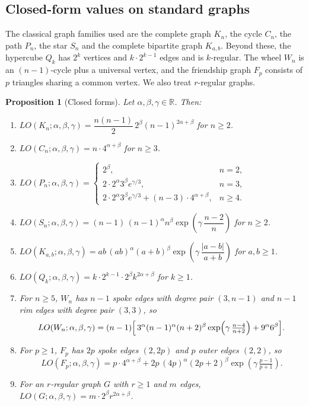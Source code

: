 \documentclass[a5paper, 10pt]{article}
\theoremstyle{plain}
\newtheorem{proposition}[theorem]{Proposition}
\theoremstyle{remark}
\theoremstyle{definition}
\newcommand{\Wuzi}{LO(G;\alpha,\beta,\gamma)}
\begin{document}
\subsection*{Closed-form values on standard graphs}\label{sec:closedforms}
The classical graph families used are the complete graph $K_n$, the
cycle $C_n$, the path $P_n$, the star $S_n$ and the complete bipartite
graph $K_{a,b}$. Beyond these, the hypercube $Q_k$ has $2^k$ vertices and
$k \cdot 2^{k - 1}$ edges and is $k$-regular. The wheel $W_n$ is an
$(n - 1)$-cycle plus a universal vertex, and the friendship graph $F_p$
consists of $p$ triangles sharing a common vertex. We also treat $r$-regular graphs.

  \begin{proposition}[Closed forms]\label{prop:closedforms}
  Let $\alpha, \beta, \gamma \in \mathbb{R}$. Then:
  \begin{enumerate}
  \item  $LO(K_n; \alpha, \beta, \gamma) =
    \dfrac{n(n-1)}{2}\,2^{\beta}(n - 1)^{2\alpha + \beta}$ for $n \ge 2$.
  \item  $LO(C_n; \alpha, \beta, \gamma) = n \cdot 4^{\alpha +
  \beta}$
    for $n \ge 3$.
  \item
    $LO(P_n; \alpha, \beta, \gamma) =
    \begin{cases}
      2^{\beta}, & n = 2,\\[2pt]
      2 \cdot 2^{\alpha} 3^{\beta} e^{\gamma/3}, & n = 3,\\[2pt]
      2 \cdot 2^{\alpha} 3^{\beta} e^{\gamma/3} + (n - 3) \cdot 4^{\alpha +
  \beta},
         & n \ge 4.
    \end{cases}$
  \item  $LO(S_n; \alpha, \beta, \gamma) =
    (n - 1)\,(n - 1)^{\alpha} n^{\beta} \exp\!\left(\gamma\,\dfrac{n -
  2}{n}\right)$
    for $n \ge 2$.
  \item  $LO(K_{a,b}; \alpha, \beta, \gamma) =
    ab\,(ab)^{\alpha}(a + b)^{\beta}\exp\!\left(\gamma\,\dfrac{|a - b|}{a +
  b}\right)$ for $a, b \ge 1$.
  \item  $LO(Q_k; \alpha, \beta, \gamma) =
    k \cdot 2^{k - 1} \cdot 2^{\beta} k^{2\alpha + \beta}$ for $k \ge 1$.
  \item  For $n \ge 5$, $W_n$ has $n - 1$ spoke edges with
    degree pair $(3, n - 1)$ and $n - 1$ rim edges with degree pair
    $(3, 3)$, so
    \[
    LO(W_n; \alpha, \beta, \gamma)
    = (n - 1)\Bigl[\,3^{\alpha} (n - 1)^{\alpha}(n + 2)^{\beta}
         \exp\!\left(\gamma\,\tfrac{n - 4}{n + 2}\right)
       + 9^{\alpha} 6^{\beta}\Bigr].
    \]
  \item  For $p \ge 1$, $F_p$ has $2p$ spoke edges
    $(2, 2p)$ and $p$ outer edges $(2, 2)$, so
    \[
    LO(F_p; \alpha, \beta, \gamma)
    = p \cdot 4^{\alpha + \beta}
     + 2p\,(4p)^{\alpha}(2p + 2)^{\beta}
         \exp\!\left(\gamma\,\tfrac{p - 1}{p + 1}\right).
    \]
  \item  For an $r$-regular graph $G$ with $r \ge 1$ and $m$ edges,
    $\Wuzi = m \cdot 2^{\beta} r^{2\alpha + \beta}$.
  \end{enumerate}
  \end{proposition}
\end{document}
